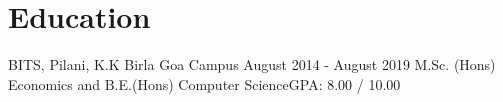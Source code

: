 \section{Education}\label{sec:education}
\resumeSubHeadingListStart
\resumeSubheading
{BITS, Pilani, K.K Birla Goa Campus} {August 2014 - August 2019}
{M.Sc. (Hons) Economics and B.E.(Hons) Computer Science}{GPA: 8.00 / 10.00}
\resumeSubHeadingListEnd